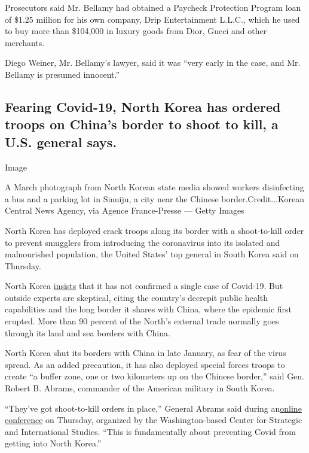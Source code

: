 Prosecutors said Mr. Bellamy had obtained a Paycheck Protection Program
loan of \$1.25 million for his own company, Drip Entertainment L.L.C.,
which he used to buy more than \$104,000 in luxury goods from Dior,
Gucci and other merchants.

Diego Weiner, Mr. Bellamy's lawyer, said it was ``very early in the
case, and Mr. Bellamy is presumed innocent.''

\hypertarget{fearing-covid-19-north-korea-has-ordered-troops-on-chinas-border-to-shoot-to-kill-a-us-general-says}{%
\subsection{Fearing Covid-19, North Korea has ordered troops on China's
border to shoot to kill, a U.S. general
says.}\label{fearing-covid-19-north-korea-has-ordered-troops-on-chinas-border-to-shoot-to-kill-a-us-general-says}}

Image

A March photograph from North Korean state media showed workers
disinfecting a bus and a parking lot in Sinuiju, a city near the Chinese
border.Credit...Korean Central News Agency, via Agence France-Presse ---
Getty Images

North Korea has deployed crack troops along its border with a
shoot-to-kill order to prevent smugglers from introducing the
coronavirus into its isolated and malnourished population, the United
States' top general in South Korea said on Thursday.

North Korea
\href{https://www.nytimes3xbfgragh.onion/2020/03/31/world/asia/north-korea-coronavirus.html}{insists}
that it has not confirmed a single case of Covid-19. But outside experts
are skeptical, citing the country's decrepit public health capabilities
and the long border it shares with China, where the epidemic first
erupted. More than 90 percent of the North's external trade normally
goes through its land and sea borders with China.

North Korea shut its borders with China in late January, as fear of the
virus spread. As an added precaution, it has also deployed special
forces troops to create ``a buffer zone, one or two kilometers up on the
Chinese border,'' said Gen. Robert B. Abrams, commander of the American
military in South Korea.

``They've got shoot-to-kill orders in place,'' General Abrams said
during an\href{https://www.youtube.com/watch?v=8XkZScCeCWQ}{online
conference} on Thursday, organized by the Washington-based Center for
Strategic and International Studies. ``This is fundamentally about
preventing Covid from getting into North Korea.''

